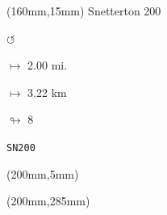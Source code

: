 \begin{textblock*}{40mm}(160mm,15mm)%
Snetterton 200
\par \Huge$\circlearrowleft$
\Large
\par$\mapsto$ 2.00 mi.
\par$\mapsto$ 3.22 km
\par$\looparrowright$ 8
\par\hfill\tiny\tt SN200\\
\end{textblock*}
\begin{textblock*}{20mm}(200mm,5mm)%
\fbox{\thepage}
\end{textblock*}
\begin{textblock*}{20mm}(200mm,285mm)%
\fbox{\thepage}
\end{textblock*}
\null\newpage

